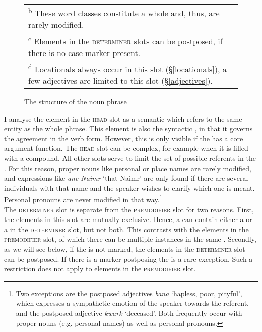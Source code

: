 \begin{figure}[H]
\begin{tabular}{|llllll|}
		\multicolumn{6}{l}{\scriptsize{\textsuperscript{b} These word classes constitute a whole \isi{noun phrase} and, thus, are rarely modified.}}\\
		\multicolumn{6}{l}{\scriptsize{\textsuperscript{c} Elements in the \textsc{determiner} slots can be postposed, if there is no case marker present.}}\\
		\multicolumn{6}{l}{\scriptsize{\textsuperscript{d} Locationals always occur in this slot (\S{}\ref{locationals}), a few adjectives are limited to this slot (\S{}\ref{adjectives}).}}\\
	\end{tabular}
\caption{The structure of the noun phrase}
\label{nounphrasestruc}
\end{figure}

I analyse the element in the \textsc{head} slot as a semantic  which refers to the same entity as the whole phrase. This element is also the syntactic , in that it governs the agreement in the verb form. However, this is only visible if the  has a core argument function. The \textsc{head} slot can be complex, for example when it is filled with a compound. All other slots serve to limit the set of possible referents in the . For this reason, proper nouns like personal or place names are rarely modified, and expressions like \emph{ane Naimr} `that Naimr' are only found if there are several individuals with that name and the speaker wishes to clarify which one is meant. Personal pronouns are never modified in that way.\footnote{Two exceptions are the postposed adjectives \emph{bana} `hapless, poor, pityful', which expresses a sympathetic emotion of the speaker towards the referent, and the postposed adjective \emph{kwark} `deceased'. Both frequently occur with proper nouns (e.g. personal names) as well as personal pronouns.}\\

The \textsc{determiner} slot is separate from the \textsc{premodifier} slot for two reasons. First, the elements in this slot are mutually exclusive. Hence, a  can contain either a  or a  in the \textsc{determiner} slot, but not both. This contrasts with the elements in the \textsc{premodifier} slot, of which there can be multiple instances in the same . Secondly, as we will see below, if the  is not  marked, the elements in the \textsc{determiner} slot can be postposed. If there is a  marker postposing the  is a rare exception. Such a restriction does not apply to elements in the \textsc{premodifier} slot.\\

